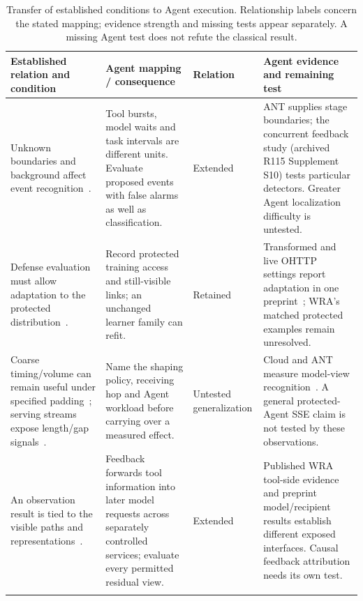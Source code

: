 \begin{table}[t]\centering\small
\caption{Transfer of established conditions to Agent execution. Relationship labels concern the stated mapping; evidence strength and missing tests appear separately. A missing Agent test does not refute the classical result.}\label{tab:transfer-matrix}
\setlength{\tabcolsep}{4pt}
\begin{tabularx}{\textwidth}{@{}P{.25\textwidth}P{.29\textwidth}P{.10\textwidth}Y@{}}\toprule
Established relation and condition & Agent mapping / consequence & Relation & Agent evidence and remaining test \\\midrule
Unknown boundaries and background affect event recognition~\cite{wang2016realistic,guan2021bapm,deng2023ares,trimananda2020pingpong}. & Tool bursts, model waits and task intervals are different units. Evaluate proposed events with false alarms as well as classification. & Extended & ANT supplies stage boundaries; the concurrent feedback study (archived R115 Supplement S10) tests particular detectors. Greater Agent localization difficulty is untested. \\\addlinespace[3pt]
Defense evaluation must allow adaptation to the protected distribution~\cite{dyer2012peekaboo,mathews2023critical,tramer2020adaptive}. & Record protected training access and still-visible links; an unchanged learner family can refit. & Retained & Transformed and live OHTTP settings report adaptation in one preprint~\cite{dangol2026workflow}; WRA's matched protected examples remain unresolved. \\\addlinespace[3pt]
Coarse timing/volume can remain useful under specified padding~\cite{dyer2012peekaboo}; serving streams expose length/gap signals~\cite{weiss2024prompt,whisperleak2025}. & Name the shaping policy, receiving hop and Agent workload before carrying over a measured effect. & Untested generalization & Cloud and ANT measure model-view recognition~\cite{pouryousef2026traffic,li2026ant}. A general protected-Agent SSE claim is not tested by these observations. \\\addlinespace[3pt]
An observation result is tied to the visible paths and representations~\cite{chen2010web,apthorpe2019stp}. & Feedback forwards tool information into later model requests across separately controlled services; evaluate every permitted residual view. & Extended & Published WRA tool-side evidence and preprint model/recipient results establish different exposed interfaces. Causal feedback attribution needs its own test. \\\addlinespace[3pt]

\end{tabularx}
\end{table}
